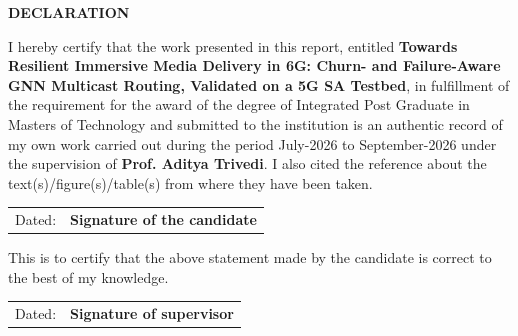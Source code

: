 
\begin{center}
{\Large \bf DECLARATION}
\end{center}
\vspace{0.5cm}
\noindent I hereby certify that the work presented in this report, entitled \textbf{Towards Resilient Immersive Media Delivery in 6G: Churn- and Failure-Aware GNN Multicast Routing, Validated on a 5G SA Testbed}, in fulfillment of the requirement for the award of the degree of Integrated Post Graduate in Masters of Technology and submitted to the institution is an authentic record of my own work carried out during the period July-2026 to September-2026 under the supervision of \textbf{Prof. Aditya Trivedi}. I also cited the reference about the text(s)/figure(s)/table(s) from where they have been taken.

\vspace{1cm}

\begin{center}
	\begin{tabular}{p{}p{}}
		Dated:  & {\bf{Signature of the candidate}} \\	
	\end{tabular}
\end{center}
\vspace{1.5cm}
\noindent This is to certify that the above statement made by the candidate is correct to the best of my knowledge.

\vspace{1.5cm}

\begin{center}
	\begin{tabular}{p{}p{}}
		Dated: & {\bf{Signature of supervisor}} \\	
	\end{tabular}
\end{center}
